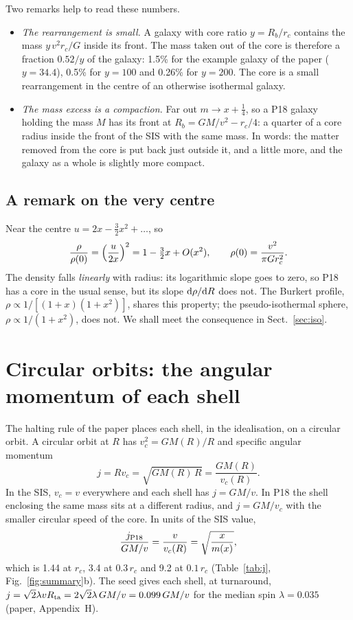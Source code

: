 \documentclass[11pt,a4paper]{article}
\newcommand{\rc}{r_c}
\newcommand{\Rb}{R_b}
\begin{document}
Two remarks help to read these numbers.
\begin{itemize}
\item \emph{The rearrangement is small.} A galaxy with core ratio $y=\Rb/\rc$
  contains the mass $y\,v^2\rc/G$ inside its front. The mass taken out of the core is
  therefore a fraction $0.52/y$ of the galaxy: 1.5\% for the example galaxy of the
  paper ($y=34.4$), 0.5\% for $y=100$ and 0.26\% for $y=200$. The core is a small
  rearrangement in the centre of an otherwise isothermal galaxy.
\item \emph{The mass excess is a compaction.} Far out $m\to x+\tfrac14$, so a P18
  galaxy holding the mass $M$ has its front at $\Rb=GM/v^2-\rc/4$: a quarter of a
  core radius inside the front of the SIS with the same mass. In words: the matter
  removed from the core is put back just outside it, and a little more, and the
  galaxy as a whole is slightly more compact.
\end{itemize}

\subsection{A remark on the very centre}
Near the centre $u=2x-\tfrac32x^2+\dots$, so
\begin{equation}
  \frac{\rho}{\rho(0)}=\Bigl(\frac{u}{2x}\Bigr)^2=1-\tfrac32x+O(x^2),
  \qquad \rho(0)=\frac{v^2}{\pi G\rc^2}.
  \label{eq:centre}
\end{equation}
The density falls \emph{linearly} with radius: its logarithmic slope goes to zero,
so P18 has a core in the usual sense, but its slope ${\rm d}\rho/{\rm d}R$ does not.
The Burkert profile, $\rho\propto1/[(1+x)(1+x^2)]$, shares this property; the
pseudo-isothermal sphere, $\rho\propto1/(1+x^2)$, does not. We shall meet the
consequence in Sect.~\ref{sec:iso}.

\section{Circular orbits: the angular momentum of each shell}\label{sec:circ}

The halting rule of the paper places each shell, in the idealisation, on a circular
orbit. A circular orbit at $R$ has $v_c^2=GM(R)/R$ and specific angular momentum
\begin{equation}
  j=Rv_c=\sqrt{GM(R)\,R}=\frac{GM(R)}{v_c(R)}.
  \label{eq:jcirc}
\end{equation}
In the SIS, $v_c=v$ everywhere and each shell has $j=GM/v$. In P18 the shell
enclosing the same mass sits at a different radius, and $j=GM/v_c$ with the smaller
circular speed of the core. In units of the SIS value,
\begin{equation}
  \frac{j_{\rm P18}}{GM/v}=\frac{v}{v_c(R)}=\sqrt{\frac{x}{m(x)}},
\end{equation}
which is 1.44 at $\rc$, 3.4 at $0.3\,\rc$ and 9.2 at $0.1\,\rc$
(Table~\ref{tab:j}, Fig.~\ref{fig:summary}b). The seed gives each shell, at
turnaround, $j=\sqrt2\lambda vR_{\rm ta}=2\sqrt2\lambda\,GM/v=0.099\,GM/v$ for the
median spin $\lambda=0.035$ (paper, Appendix~H).
\end{document}
